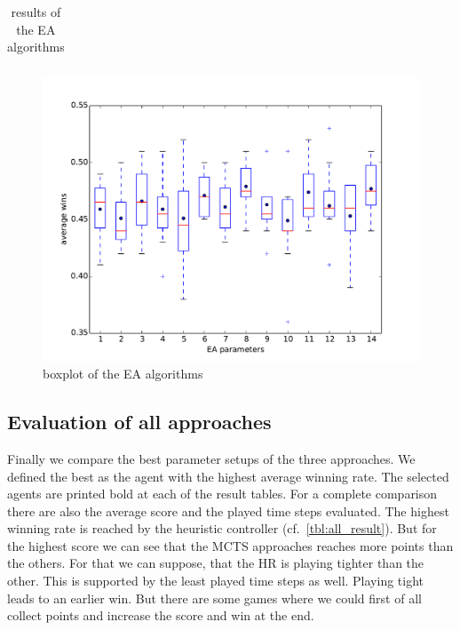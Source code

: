 \begin{minipage}{1\textwidth}
\begin{table}[H]
\begin{tabular}{*9c}
\end{tabular}
\label{ea_result}
\caption{results of the \ac{EA} algorithms}
\end{table}
\vspace{-2cm}
\begin{figure}[H]
\centering
\includegraphics[scale=0.6]{images/eval_evolutionary.pdf}
\caption{boxplot of the \ac{EA} algorithms}
\label{fig:eval_evo}
\end{figure}
\end{minipage}



\subsection{Evaluation of all approaches} 

Finally we compare the best parameter setups of the three approaches. We defined the best as the agent with the highest average winning rate.
The selected agents are printed bold at each of the result tables.
For a complete comparison there are also the average score and the played time steps evaluated.
The highest winning rate is reached by the heuristic controller (cf.~\cref{tbl:all_result}).
But for the highest score we can see that the \ac{MCTS} approaches reaches more points than the others.
For that we can suppose, that the \ac{HR} is playing tighter than the other. This is supported by the least played time steps as well.
Playing tight leads to an earlier win. But there are some games where we could first of all collect points and increase the score and
win at the end.



